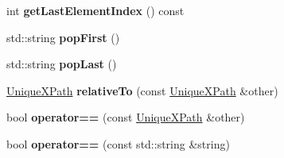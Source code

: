 \begin{DoxyCompactItemize}
\item 
\hypertarget{classcpcr_1_1UniqueXPath_a02fb1823fa77eadd30ff65effedeb848}{int {\bfseries get\-Last\-Element\-Index} () const }\label{classcpcr_1_1UniqueXPath_a02fb1823fa77eadd30ff65effedeb848}

\item 
\hypertarget{classcpcr_1_1UniqueXPath_a0e48bccef51b3d862cd1f417d693354c}{std\-::string {\bfseries pop\-First} ()}\label{classcpcr_1_1UniqueXPath_a0e48bccef51b3d862cd1f417d693354c}

\item 
\hypertarget{classcpcr_1_1UniqueXPath_a34fa02c1c9ada5c3552dfd52202f1d2c}{std\-::string {\bfseries pop\-Last} ()}\label{classcpcr_1_1UniqueXPath_a34fa02c1c9ada5c3552dfd52202f1d2c}

\item 
\hypertarget{classcpcr_1_1UniqueXPath_a55e46de7c69a31bbea4fdb75c11b10e5}{\hyperlink{classcpcr_1_1UniqueXPath}{Unique\-X\-Path} {\bfseries relative\-To} (const \hyperlink{classcpcr_1_1UniqueXPath}{Unique\-X\-Path} \&other)}\label{classcpcr_1_1UniqueXPath_a55e46de7c69a31bbea4fdb75c11b10e5}

\item 
\hypertarget{classcpcr_1_1UniqueXPath_a15e27236ee99ef737e976954377ea40c}{bool {\bfseries operator==} (const \hyperlink{classcpcr_1_1UniqueXPath}{Unique\-X\-Path} \&other)}\label{classcpcr_1_1UniqueXPath_a15e27236ee99ef737e976954377ea40c}

\item 
\hypertarget{classcpcr_1_1UniqueXPath_ac1c0c8f241ee5e60cb68d1799930220d}{bool {\bfseries operator==} (const std\-::string \&string)}\label{classcpcr_1_1UniqueXPath_ac1c0c8f241ee5e60cb68d1799930220d}

\end{DoxyCompactItemize}
